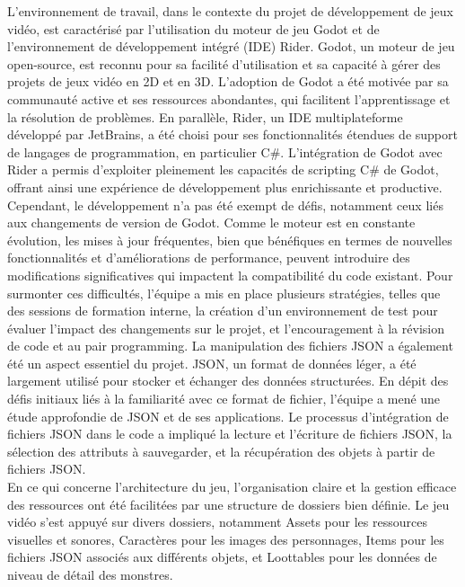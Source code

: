 L'environnement de travail, dans le contexte du projet de développement de jeux vidéo, est caractérisé par l'utilisation du moteur de jeu Godot et de l'environnement de
développement intégré (IDE) Rider. Godot, un moteur de jeu open-source, est reconnu pour sa facilité d'utilisation et sa capacité à gérer des projets de jeux vidéo en 2D et
en 3D. L'adoption de Godot a été motivée par sa communauté active et ses ressources abondantes, qui facilitent l'apprentissage et la résolution de problèmes. En parallèle,
Rider, un IDE multiplateforme développé par JetBrains, a été choisi pour ses fonctionnalités étendues de support de langages de programmation, en particulier C\#.
L'intégration de Godot avec Rider a permis d'exploiter pleinement les capacités de scripting C\# de Godot, offrant ainsi une expérience de développement plus
enrichissante et productive.
\\

Cependant, le développement n'a pas été exempt de défis, notamment ceux liés aux changements de version de Godot. Comme le moteur est en constante évolution,
les mises à jour fréquentes, bien que bénéfiques en termes de nouvelles fonctionnalités et d'améliorations de performance, peuvent introduire des modifications
significatives qui impactent la compatibilité du code existant. Pour surmonter ces difficultés, l'équipe a mis en place plusieurs stratégies, telles que des sessions de
formation interne, la création d'un environnement de test pour évaluer l'impact des changements sur le projet, et l'encouragement à la révision de code et au pair programming.
La manipulation des fichiers JSON a également été un aspect essentiel du projet. JSON, un format de données léger, a été largement utilisé pour stocker et échanger
des données structurées. En dépit des défis initiaux liés à la familiarité avec ce format de fichier, l'équipe a mené une étude approfondie de JSON et de ses applications.
Le processus d'intégration de fichiers JSON dans le code a impliqué la lecture et l'écriture de fichiers JSON, la sélection des attributs à sauvegarder, et la récupération
des objets à partir de fichiers JSON.
\\

En ce qui concerne l'architecture du jeu, l'organisation claire et la gestion efficace des ressources ont été facilitées par une structure de dossiers bien définie.
Le jeu vidéo s'est appuyé sur divers dossiers, notamment Assets pour les ressources visuelles et sonores, Caractères pour les images des personnages,
Items pour les fichiers JSON associés aux différents objets, et Loottables pour les données de niveau de détail des monstres.
\\

